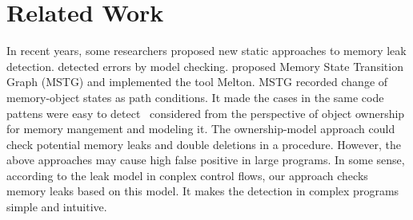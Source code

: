 \section{Related Work}\label{sec:related}

In recent years, some researchers proposed new static approaches to memory leak detection. \cite{XZX11,XZX15,HL06,YXYR14} detected errors by model checking. \cite{XZX11,XZX15} proposed Memory State Transition Graph (MSTG) and implemented the tool Melton. MSTG recorded change of memory-object states as path conditions. It made the cases in the same code pattens were easy to detect~\cite{HL06} considered from the perspective of object ownership for memory mangement and modeling it. The ownership-model approach could check potential memory leaks and double deletions in a procedure. However, the above approaches may cause high false positive in large programs. In some sense, according to the leak model in conplex control flows, our approach checks memory leaks based on this model. It makes the detection in complex programs simple and intuitive. 
 
